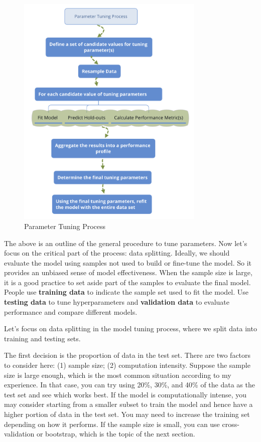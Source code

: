 \documentclass[
  12pt,
]{krantz}
\begin{document}
\begin{figure}
\centering
\includegraphics[width=0.8\textwidth,height=\textheight]{images/ParameterTuningProcess.png}
\caption{Parameter Tuning Process}
\end{figure}

The above is an outline of the general procedure to tune parameters. Now let's focus on the critical part of the process: data splitting. Ideally, we should evaluate the model using samples not used to build or fine-tune the model. So it provides an unbiased sense of model effectiveness. When the sample size is large, it is a good practice to set aside part of the samples to evaluate the final model. People use \textbf{training data} to indicate the sample set used to fit the model. Use \textbf{testing data} to tune hyperparameters and \textbf{validation data} to evaluate performance and compare different models.

Let's focus on data splitting in the model tuning process, where we split data into training and testing sets.

The first decision is the proportion of data in the test set. There are two factors to consider here: (1) sample size; (2) computation intensity. Suppose the sample size is large enough, which is the most common situation according to my experience. In that case, you can try using 20\%, 30\%, and 40\% of the data as the test set and see which works best. If the model is computationally intense, you may consider starting from a smaller subset to train the model and hence have a higher portion of data in the test set. You may need to increase the training set depending on how it performs. If the sample size is small, you can use cross-validation or bootstrap, which is the topic of the next section.
\end{document}
